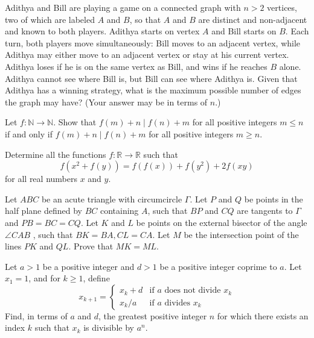 \documentclass[11pt]{scrartcl}
\begin{document}
\begin{problem}[3075694960611200431]
Adithya and Bill are playing a game on a connected graph with $n > 2$ vertices, two of which are labeled $A$ and $B$, so that $A$ and $B$ are distinct and non-adjacent and known to both players. Adithya starts on vertex $A$ and Bill starts on $B$. Each turn, both players move simultaneously: Bill moves to an adjacent vertex, while Adithya may either move to an adjacent vertex or stay at his current vertex. Adithya loses if he is on the same vertex as Bill, and wins if he reaches $B$ alone. Adithya cannot see where Bill is, but Bill can see where Adithya is. Given that Adithya has a winning strategy, what is the maximum possible number of edges the graph may have? (Your answer may be in terms of $n$.)
\end{problem}
\begin{problem}[3102273497351946473]
	Let $f:\mathbb N\to \mathbb N$. Show that $f(m)+n\mid f(n)+m$ for all positive integers $m\le n$ if and only if $f(m)+n\mid f(n)+m$ for all positive integers $m\ge n$.
\end{problem}
\begin{problem}[3104172479883832933]
	Determine all the functions $f : \mathbb{R} \to \mathbb{R}$ such that
\[ f(x^2 + f(y)) = f(f(x)) + f(y^2) + 2f(xy) \]for all real numbers $x$ and $y$.
\end{problem}
\begin{problem}[3104932449951237120]
	Let $ABC$ be an acute triangle with circumcircle $\Gamma$. Let $P$ and $Q$ be points in the half plane defined by $BC$ containing $A$, such that $BP$ and $CQ$ are tangents to $\Gamma$ and $PB = BC = CQ$. Let $K$ and $L$ be points on the external bisector of the angle $\angle CAB$ , such that $BK = BA, CL = CA$. Let $M$ be the intersection point of the lines $PK$ and $QL$. Prove that $MK=ML$.
\end{problem}
\begin{problem}[3159161448000677570]
Let $a > 1$ be a positive integer and $d > 1$ be a positive integer coprime to $a$. Let $x_1=1$, and for $k\geq 1$, define
$$x_{k+1} = \begin{cases}
x_k + d &\text{if } a \text{ does not divide } x_k \\
x_k/a & \text{if } a \text{ divides } x_k
\end{cases}$$Find, in terms of $a$ and $d$, the greatest positive integer $n$ for which there exists an index $k$ such that $x_k$ is divisible by $a^n$.
\end{problem}
\end{document}
